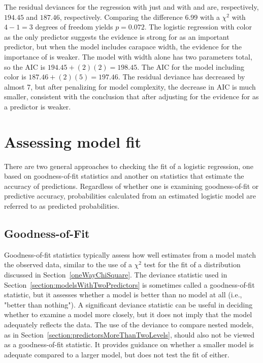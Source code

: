 The residual deviances for the regression with just  and with  and  are, respectively, $194.45$ and $187.46$, respectively.  Comparing the difference 6.99 with a $\chi^2$ with $4 - 1 = 3$ degrees of freedom yields $p = 0.072$.  The logistic regression with color as the only predictor suggests the evidence is strong for  as an important predictor, but when the model includes carapace width, the evidence for the importance of  is weaker. The model with width alone has two parameters total, so the AIC is $194.45 + (2)(2) = 198.45$. The AIC for the model including color is $187.46 + (2)(5) = 197.46$.  The residual deviance has decreased by almost 7, but after penalizing for model complexity, the decrease in AIC is much smaller, consistent with the conclusion that after adjusting for  the evidence for  as a predictor is weaker.







\section{Assessing model fit}
\label{assessingModelFitMultipleLogisticRegression}

There are two general approaches to checking the fit of a logistic regression, one based on goodness-of-fit statistics and another on statistics that estimate the accuracy of predictions. Regardless of whether one is examining goodness-of-fit or predictive accuracy, probabilities calculated from an estimated logistic model are referred to as predicted probabilities.

\subsection{Goodness-of-Fit}

Goodness-of-fit statistics typically assess how well estimates from a model match the observed data, similar to the use of a $\chi^2$ test for the fit of a distribution discussed in Section~\ref{oneWayChiSquare}. The deviance statistic used in Section~\ref{section:modelsWithTwoPredictors} is sometimes called a goodness-of-fit statistic, but it assesses whether a model is better than no model at all (i.e., "better than nothing"). A significant deviance statistic can be useful in deciding whether to examine a model more closely, but it does not imply that the model adequately reflects the data.  The use of the deviance to compare nested models, as in  Section~\ref{section:predictorsMoreThanTwoLevels}, should also not be viewed as a goodness-of-fit statistic.  It provides guidance on whether a smaller model is adequate compared to a larger model, but does not test the fit of either.

